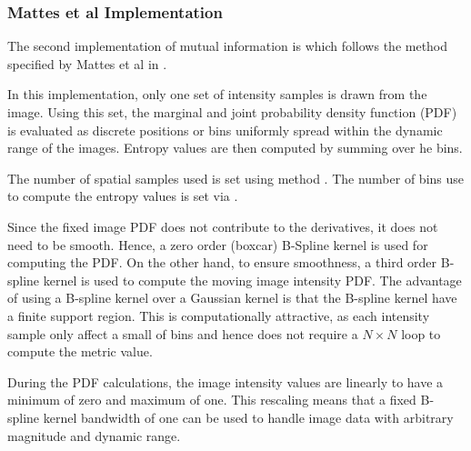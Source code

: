 \subsubsection{Mattes et al Implementation}
The second implementation of mutual information is 
 which follows the method
specified by Mattes et al in \cite{Mattes:2001}.

In this implementation, only one set of intensity samples is drawn from the image.
Using this set, the marginal and joint probability density function (PDF)
is evaluated as discrete positions or bins uniformly spread within the dynamic range
of the images. Entropy values are then computed by summing over he bins.


The number of spatial samples used is set using method 
. The number of bins use to compute
the entropy values is set via .

Since the fixed image PDF does not contribute to the derivatives, it does
not need to be smooth. Hence, a zero order (boxcar) B-Spline kernel is
used for computing the PDF. On the other hand, to ensure smoothness,
a third order B-spline kernel is used to compute the moving image
intensity PDF. The advantage of using a B-spline kernel over a Gaussian kernel
is that the B-spline kernel have a finite support region. This is 
computationally attractive, as each intensity sample only affect a small
of bins and hence does not require a $N \times N$ loop to compute the
metric value.

During the PDF calculations, the image intensity values are linearly to have
a minimum of zero and maximum of one. This rescaling means that a fixed
B-spline kernel bandwidth of one can be used to handle image data 
with arbitrary magnitude and dynamic range.
